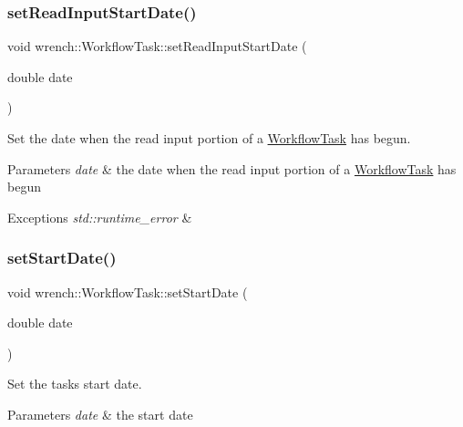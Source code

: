 \subsubsection{\texorpdfstring{set\+Read\+Input\+Start\+Date()}{setReadInputStartDate()}}
{\footnotesize\ttfamily void wrench\+::\+Workflow\+Task\+::set\+Read\+Input\+Start\+Date (\begin{DoxyParamCaption}\item[{double}]{date }\end{DoxyParamCaption})}



Set the date when the read input portion of a \hyperlink{classwrench_1_1_workflow_task}{Workflow\+Task} has begun. 


\begin{DoxyParams}{Parameters}
{\em date} & the date when the read input portion of a \hyperlink{classwrench_1_1_workflow_task}{Workflow\+Task} has begun \\
\hline
\end{DoxyParams}

\begin{DoxyExceptions}{Exceptions}
{\em std\+::runtime\+\_\+error} & \\
\hline
\end{DoxyExceptions}
\mbox{\label{classwrench_1_1_workflow_task_a8ef6d18ed65d9815bf8ebf2dcc3549da}} 
\subsubsection{\texorpdfstring{set\+Start\+Date()}{setStartDate()}}
{\footnotesize\ttfamily void wrench\+::\+Workflow\+Task\+::set\+Start\+Date (\begin{DoxyParamCaption}\item[{double}]{date }\end{DoxyParamCaption})}



Set the task\textquotesingle{}s start date. 


\begin{DoxyParams}{Parameters}
{\em date} & the start date \\
\hline
\end{DoxyParams}
\mbox{\label{classwrench_1_1_workflow_task_a5f2f2a4897400b5f78f4fe193e66342f}} 

